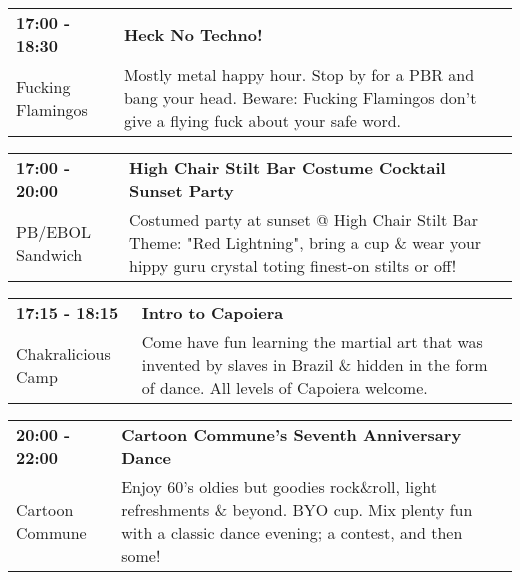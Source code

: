 \begin{tabular}{ p{1in} p{2.2in} }
    \textbf{17:00 - 18:30} & \textbf{Heck No Techno!} \\
    Fucking Flamingos \newline  & Mostly metal happy hour. Stop by for a PBR and bang your head. Beware: Fucking Flamingos don't give a flying fuck about your safe word. \\
    \hline 
\end{tabular}
    
\begin{tabular}{ p{1in} p{2.2in} }
    \textbf{17:00 - 20:00} & \textbf{High Chair Stilt Bar Costume Cocktail Sunset Party} \\
    PB/EBOL Sandwich \newline  & Costumed party at sunset @ High Chair Stilt Bar Theme: "Red Lightning", bring a cup \& wear your hippy guru crystal toting finest-on stilts or off! \\
    \hline 
\end{tabular}
    
\begin{tabular}{ p{1in} p{2.2in} }
    \textbf{17:15 - 18:15} & \textbf{Intro to Capoiera} \\
    Chakralicious Camp \newline  & Come have fun learning the martial art that was invented by slaves in Brazil \& hidden in the form of dance. All levels of Capoiera welcome. \\
    \hline 
\end{tabular}
    
\begin{tabular}{ p{1in} p{2.2in} }
    \textbf{20:00 - 22:00} & \textbf{Cartoon Commune's Seventh Anniversary Dance} \\
    Cartoon Commune \newline  & Enjoy 60's oldies but goodies rock\&roll, light refreshments \& beyond. BYO cup. Mix plenty fun with a classic dance evening; a contest, and then some! \\
    \hline 
\end{tabular}
    